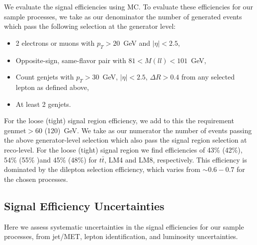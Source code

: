 We evaluate the signal efficiencies using MC. To evaluate these efficiencies for our sample processes, 
we take as our denominator the number of generated events which pass the following selection at
the generator level:

\begin{itemize}
\item 2 electrons or muons with $p_T>20$~GeV and $|\eta|<2.5$,
\item Opposite-sign, same-flavor pair with $81 < M(ll) < 101$~GeV,
\item Count genjets with $p_T > 30$~GeV, $|\eta|<2.5$, $\Delta R > 0.4$ from any selected lepton as defined above,
\item At least 2 genjets.
\end{itemize}

For the loose (tight) signal region efficiency, we add to this the requirement genmet$>60$ (120)~GeV.
We take as our numerator the number of events passing the above generator-level selection which
also pass the signal region selection at reco-level. 
For the loose (tight) signal region we find efficiencies of 43\% (42\%), 54\% (55\% )and 45\% (48\%) 
for $t\bar{t}$, LM4 and LM8, respectively.
This efficiency is dominated by the dilepton selection efficiency, which varies from $\sim0.6-0.7$ for the chosen 
processes. 



\subsection{Signal Efficiency Uncertainties}

Here we assess systematic uncertainties in the signal efficiencies for our sample processes, from
jet/MET, lepton identification, and luminosity uncertainties. 


